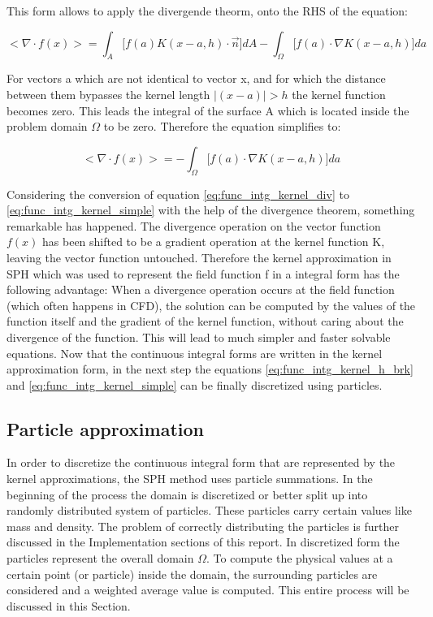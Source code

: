 This form allows to apply the divergende theorm, onto the RHS of the equation:

\begin{equation} \label{func_intg_kernel_h_brk_div_theo}
< \nabla \cdot f(x) > = 
\int_{A} \biggl [ f(a) K(x-a, h) \cdot \vec{n}  \biggr ] d A -
\int_{\Omega} \biggl [ f(a) \cdot \nabla K(x-a, h) \biggr ] d a
\end{equation}

For vectors a which are not identical to vector x, and for which the distance between them bypasses the kernel length  $|(x-a)| > h $  the kernel function becomes zero. This leads the integral of the surface A which is located inside the problem domain $\Omega$ to be zero. Therefore the equation simplifies to:

\begin{equation} \label{eq:func_intg_kernel_simple}
< \nabla \cdot f(x) > = 
- \int_{\Omega} \biggl [ f(a) \cdot \nabla K(x-a, h) \biggr ] d a
\end{equation}

Considering the conversion of equation \ref{eq:func_intg_kernel_div} to \ref{eq:func_intg_kernel_simple} with the help of the divergence theorem, something remarkable has happened. The divergence operation on the vector function $f(x)$ has been shifted to be a gradient operation at the kernel function K, leaving the vector function untouched. Therefore the kernel approximation in SPH which was used to represent the field function f in a integral form has the following advantage: When a divergence operation occurs at the field function (which often happens in CFD), the solution can be computed by the values of the function itself and the gradient of the kernel function, without caring about the divergence of the function. This will lead to much simpler and faster solvable equations. Now that the continuous integral forms are written in the kernel approximation form, in the next step the equations \ref{eq:func_intg_kernel_h_brk} and \ref{eq:func_intg_kernel_simple} can be finally discretized using particles.

\subsection{Particle approximation}

In order to discretize the continuous integral form that are represented by the kernel approximations, the SPH method uses particle summations. In the beginning of the process the domain is discretized or better split up into randomly distributed system of particles. These particles carry certain values like mass and density. The problem of correctly distributing the particles is further discussed in the Implementation sections of this report. 
In discretized form the particles represent the overall domain $\Omega$. To compute the physical values at a certain point (or particle) inside the domain, the surrounding particles are considered and a weighted average value is computed. This entire process will be discussed in this Section.

